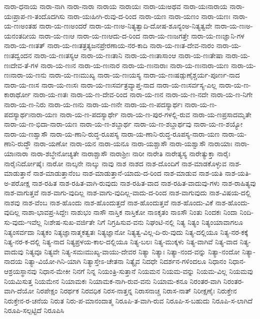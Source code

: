 {ನಾರಾ-ಧನಾಯ
ನಾರಾ-ನಾಗಿ
ನಾರಾ-ನಾರಾ
ನಾರಾಯ
ನಾರಾಯಃ
ನಾರಾ-ಯಃಅಥವ
ನಾರಾ-ಯಃನಾರಾಯ
ನಾರಾ-ಯಃಪ್ರಾಪ-ಣ-ತಂದೊದಗಿಸು
ನಾರಾ-ಯಃಹೀಗಿ-ರುವು-ದ-ರಿಂದ
ನಾರಾ-ಯಣ
ನಾರಾ-ಯಣಂ
ನಾರಾ-ಯಣಃ
ನಾರಾ-ಯ-ಣಃಅಂತಹ
ನಾರಾ-ಯ-ಣಃಅಂದರೆ
ನಾರಾ-ಯ-ಣಃಅ-ನಿತ್ಯತ್ವಾದಿ-ದೋಷ-ಶೂನ್ಯಂಅ-ನಿತ್ಯತ್ವವೇ
ನಾರಾ-ಯ-ಣಃಅ-ಯನಂತದೀಯ
ನಾರಾ-ಯ-ಣಃಆ
ನಾರಾ-ಯ-ಣಃಆದು-ದ-ರಿಂದ
ನಾರಾ-ಯ-ಣಃಜಗತ್ತೇ
ನಾರಾ-ಯ-ಣಃಜ್ಞಾನಿ-ಗಳ
ನಾರಾ-ಯ-ಣಃತತ್
ನಾರಾ-ಯ-ಣಃತತ್ರತ್ಯಜನಪ್ರೇರಣಾಯ-ನರ-ಕಾದಿ
ನಾರಾ-ಯ-ಣಃತ-ದೇವ-ನಾರಂ
ನಾರಾ-ಯ-ಣಃತದ್ವಂದನ
ನಾರಾ-ಯ-ಣಃತಸ್ಯಆ
ನಾರಾ-ಯ-ಣಃತಾನಿ
ನಾರಾ-ಯ-ಣಃತಾಸಾಂಆ
ನಾರಾ-ಯ-ಣಃತೇಷಾ
ನಾರಾ-ಯ-ಣಃದೇವ-ತೆ-ಗಳ
ನಾರಾ-ಯ-ಣಃನ
ನಾರಾ-ಯ-ಣಃನಾರ
ನಾರಾ-ಯ-ಣಃನಾರಾಃ
ನಾರಾ-ಯ-ಣಃನಾರಾ-ಯಣ
ನಾರಾ-ಯ-ಣಃನಾರಾ-ಯ-ಣನು
ನಾರಾ-ಯ-ಣಃಮುಖ್ಯ
ನಾರಾ-ಯ-ಣಃಯಸ್ಯ
ನಾರಾ-ಯ-ಣಃಷಡ್ಗುಣೈಶ್ಚರ್ಯ-ಪೂರ್ಣ-ನಾದ
ನಾರಾ-ಯ-ಣಃಸ
ನಾರಾ-ಯ-ಣಃಸಃ
ನಾರಾ-ಯ-ಣಃಸರ್ವತ್ರವ್ಯಾಪ್ತ-ನಾದ
ನಾರಾ-ಯ-ಣಃಸರ್ವಸ್ಯ-ಎಲ್ಲ
ನಾರಾ-ಯ-ಣ-ಕಾರಾರ್ಥೋ
ನಾರಾ-ಯ-ಣತಃ
ನಾರಾ-ಯ-ಣ-ದೇವ-ರಿಂದ
ನಾರಾ-ಯ-ಣನ
ನಾರಾ-ಯ-ಣ-ನದೇ
ನಾರಾ-ಯ-ಣ-ನಿಗೇ
ನಾರಾ-ಯ-ಣ-ನಿರು
ನಾರಾ-ಯ-ಣನು
ನಾರಾ-ಯ-ಣನೇ
ನಾರಾ-ಯ-ಣ-ಪದಸ್ಯಾರ್ಥಃ
ನಾರಾ-ಯ-ಣ-ಪದಸ್ಯಾರ್ಥಃನಾರಾ-ಯಣ
ನಾರಾ-ಯ-ಣ-ಪದಸ್ಯಾರ್ಥೇ
ನಾರಾ-ಯ-ಣ-ಪುರ-ಗಳಲ್ಲಿ-ರುವ
ನಾರಾ-ಯ-ಣಪ್ರಸಾದಮೃತೇ
ನಾರಾ-ಯ-ಣ-ಭಿದಾ-ನಾರಾ-ಯಣ
ನಾರಾ-ಯ-ಣ-ಶಬ್ದಾರ್ಥ
ನಾರಾ-ಯ-ಣ-ಶಬ್ದಾರ್ಥವು
ನಾರಾ-ಯ-ಣ-ಶಯ್ಯೋ
ನಾರಾ-ಯ-ಣಶ್ವಾಸೌ
ನಾರಾ-ಯ-ಣಾನಿ-ರುದ್ಧ-ರೂಪಸ್ಯ
ನಾರಾ-ಯ-ಣಾನಿ-ರುದ್ಧ-ರೂಪಸ್ಯ-ನಾರಾ-ಯಣ
ನಾರಾ-ಯ-ಣಾನಿ-ರುದ್ಧೌ
ನಾರಾ-ಯಣೋ
ನಾರಾ-ಯನ
ನಾರಾ-ಯನೂ
ನಾರಾ-ಯಶ್ಚಾಸೌ
ನಾರಾ-ಯಶ್ವಾಸೌ
ನಾರಾಯಾಃ
ನಾರಾ-ಯಾಃನಾರಾ
ನಾರಾ-ಶಬ್ಧೇನೋಚ್ಯತೇ
ನಾರಾಶ್ಚಾಸೌ
ನಾರಾಶ್ರೀಃ
ನಾರೀ
ನಾರೇತಿ
ನಾರೇತ್ಯಸ್ಯ
ನಾರೇತ್ಯುಕ್ತಾ
ನಾರೈಃ
ನಾರೈಃನಿರ್ದೋಷೈಃ
ನಾರೋ
ನಾಲ್ಕನೇ
ನಾಲ್ಕು
ನಾವು
ನಾಶ
ನಾಶದ
ನಾಶ-ದೊಂದಿಗೆ
ನಾಶ-ಮಾಡಕೊಳ್ಳುವ
ನಾಶ-ಮಾಡುತ್ತಾನೆ
ನಾಶ-ಮಾಡುತ್ತಾನೆಂಬ
ನಾಶ-ಮಾಡುತ್ತಾನೆ-ಯಾದು-ದ-ರಿಂದ
ನಾಶ-ಮಾಡುವ
ನಾಶ-ಯತಿ
ನಾಶ-ಯತಿ-ಅ-ಪರೋಕ್ಷ
ನಾಶ-ರಹಿತ
ನಾಶ-ರಹಿತ-ವಾಗಿ-ರುವುದು
ನಾಶ-ರಹಿತ-ವಾದ
ನಾಶ-ರಹಿತ-ವಾದುವು-ಗಳು
ನಾಶ-ರಾಹಿತ್ಯವು
ನಾಶ-ವಾಗುತ್ತವೆ
ನಾಶ-ವಾಗು-ವುದಿಲ್ಲ
ನಾಶ-ವಾಗು-ವುದಿಲ್ಲ-ವಾದು-ದ-ರಿಂದ
ನಾಶ-ವಾಗುವುದು
ನಾಶ-ವಿಷಯ-ದಲ್ಲಿ
ನಾಶವು
ನಾಶ-ವೆಂಬ
ನಾಶ-ಹೊಂದು
ನಾಶ-ಹೊಂದುತ್ತದೆ
ನಾಶ-ಹೊಂದುತ್ತವೆ
ನಾಶ-ಹೊಂದು-ವಿಕೆ
ನಾಶ-ಹೊಂದು-ವುದಿಲ್ಲ
ನಾಶಾ-ಭಾವಪ್ರ-ಸಿದ್ದೇಃ
ನಾಶುಭಂ
ನಾಸೌ
ನಾಸ್ತಿಕ
ನಾಸ್ತಿಕೋ
ನಾಽಕೃತಂ
ನಾಽಸೌ
ನಿಂತು
ನಿಂದಕಃ
ನಿಂದಾ
ನಿಂದಿ-ಸು-ವುದು-ಇವೆಲ್ಲ
ನಿಃಶೇಷ-ಸುಖ-ವರ್ಜಿತೇ
ನಿಗೆ
ನಿಗ್ರಹಿಸುವ-ವನು
ನಿಘಂಟಿ-ನಲ್ಲಿ
ನಿತ್ಯ
ನಿತ್ಯಂ
ನಿತ್ಯಂಯಾವಾಗಲೂ
ನಿತ್ಯಂಸರ್ವದಾ
ನಿತ್ಯಕಂ
ನಿತ್ಯಜ್ಞಾನಾತ್ಮಕತ್ವತಃ
ನಿತ್ಯಜ್ಞಾನೋ
ನಿತ್ಯತ್ವ-ವಿಲ್ಲ-ದಿ-ರು-ವುದು
ನಿತ್ಯ-ದಲ್ಲಿಯೂ
ನಿತ್ಯ-ನರ-ಕಕ್ಕೆ
ನಿತ್ಯ-ನರ-ಕ-ದಲ್ಲಿ
ನಿತ್ಯ-ನಾದ
ನಿತ್ಯಪ್ರಳಯ-ಕಾಲ-ದಲ್ಲಿಯೂ
ನಿತ್ಯ-ಬಲಃ
ನಿತ್ಯ-ಮುಕ್ಕಳು
ನಿತ್ಯ-ವಾಗಿವೆ
ನಿತ್ಯ-ವಾದ
ನಿತ್ಯ-ವಾದುವು
ನಿತ್ಯವೂ
ನಿತ್ಯವೇ
ನಿತ್ಯ-ಸಮಃಮುಖ್ಯ-ವಾಯು-ದೇವರ
ನಿತ್ಯಾ
ನಿತ್ಯಾಃ
ನಿತ್ಯಾ-ನಂದ-ವನ್ನು
ನಿತ್ಯಾ-ನಂದೋ
ನಿತ್ಯಾ-ನಾದಯ
ನಿತ್ಯಾ-ವಿಯೋ-ಗಿನಿ-ಯಾಗಿ
ನಿತ್ಯಾಸ್ತೇಽ-ಚೇತನಾ
ನಿತ್ಯೈವ
ನಿದಧೇ
ನಿದರ್ಶನ-ಗಳಿಂದಲೂ
ನಿಧಾನಂ
ನಿಧಾನ-ಆಶ್ರಯಸ್ಥಾನವು
ನಿಧಾನ-ಮೇಕೀ
ನಿನಗೆ
ನಿನ್ನ
ನಿಯಂತ್ರಿ-ಸುತ್ತಾನೆ
ನಿಯಮನ
ನಿಯಮ-ವನ್ನು
ನಿಯಮ-ವಿಲ್ಲ
ನಿಯಮವು
ನಿಯಮಿಸುತ್ತ
ನಿಯಮೇನ
ನಿಯಾಮಕಃ
ನಿಯಾಮಕ-ನಾಗಿ-ರುವ-ವನು
ನಿಯಾಮ-ಕನೂ
ನಿರಂತರ-ವಾಗಿ
ನಿರಂತರ-ವಾಗಿ-ದೆಯೋ
ನಿರಪೇಕ್ಷಂ
ನಿರರ್ಥಕ
ನಿರವಧಿಕ
ನಿರಸ-ನಾತ್ತನ್ನ
ನಿರಾಸನಾಚ್ಚ
ನಿರಾಸ-ನಾತ್
ನಿರೀಕ್ಷಣೈಃ
ನಿರುಕ್ತೇನ
ನಿರುಕ್ತೇನ-ರ-ಚನೆಯ
ನಿರುತ
ನಿರು-ಪ-ಮಾನಂದಾತ್ಮ
ನಿರೂಪಿ-ತ-ವಾಗಿ-ರುವ
ನಿರೂಪಿ-ಸ-ಬಹುದು
ನಿರೂಪಿ-ಸ-ಲಾಗಿದೆ
ನಿರೂಪಿ-ಸಲ್ಪಟ್ಟಿದೆ
ನಿರೂಪಿಸಿ
}
